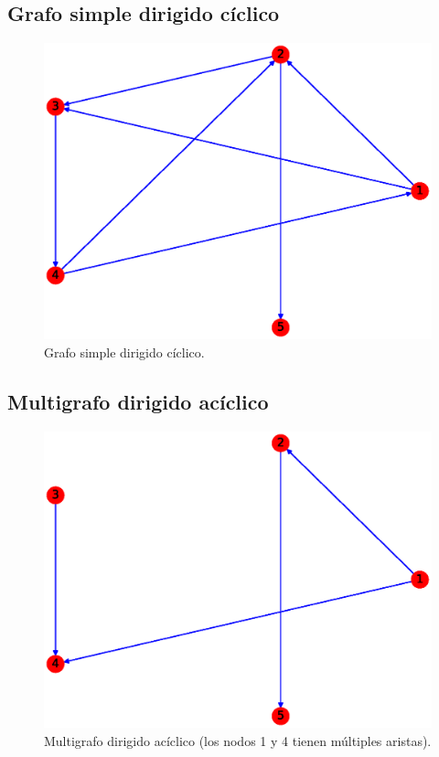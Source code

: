 \documentclass{article}
\begin{document}
\subsection{Grafo simple dirigido cíclico}
\begin{figure}[H]
    \includegraphics[width=\textwidth]{5-GSDC}
    \caption{Grafo simple dirigido cíclico.}
    \label{fig:GSDC}
\end{figure}

\subsection{Multigrafo dirigido acíclico}
\begin{figure}[H]
    \includegraphics[width=\textwidth]{10-MDA}
    \caption{Multigrafo dirigido acíclico (los nodos 1 y 4 tienen múltiples aristas).}
    \label{fig:MDA}
\end{figure}
\end{document}

